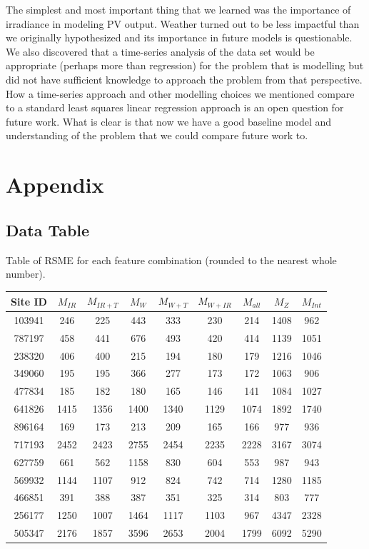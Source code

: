 \documentclass[11pt, fullpage,letterpaper]{article}
\begin{document}
The simplest and most important thing that we learned was the importance of irradiance in modeling PV output. Weather turned out to be less impactful than we originally hypothesized and its importance in future models is questionable. We also discovered that a time-series analysis of the data set would be appropriate (perhaps more than regression) for the problem that is modelling but did not have sufficient knowledge to approach the problem from that perspective. How a time-series approach and other modelling choices we mentioned compare to a standard least squares linear regression approach is an open question for future work. What is clear is that now we have a good baseline model and understanding of the problem that we could compare future work to. 


\clearpage




\section*{Appendix}

\subsection*{Data Table}
Table of RSME for each feature combination (rounded to the nearest whole number).
\begin{center}
    \begin{tabular}{|c|c|c|c|c|c|c|c|c|}
        \hline
        Site ID & $M_{IR}$ & $M_{IR + T}$ & $M_{W}$ & $M_{W + T}$ & $M_{W + IR}$ & $M_{all}$ & $M_{Z}$ & $M_{Int}$ \\
        \hline
        103941 & 246&225&443&333&230&214&1408&962 \\
        \hline
        787197&458&441&676&493&420&414&1139&1051 \\
        \hline
        238320&406&400&215&194&180&179&1216&1046 \\
        \hline
        349060&195&195&366&277&173&172&1063&906 \\
        \hline
        477834&185&182&180&165&146&141&1084&1027 \\
        \hline
        641826&1415&1356&1400&1340&1129&1074&1892&1740 \\
        \hline
        896164&169&173&213&209&165&166&977&936 \\
        \hline
        717193&2452&2423&2755&2454&2235&2228&3167&3074 \\
        \hline
        627759&661&562&1158&830&604&553&987&943\\
        \hline
        569932&1144&1107&912&824&742&714&1280&1185 \\
        \hline
        466851&391&388&387&351&325&314&803&777 \\
        \hline
        256177&1250&1007&1464&1117&1103&967&4347&2328 \\
        \hline
        505347&2176&1857&3596&2653&2004&1799&6092&5290 \\
        \hline

    \end{tabular}
\end{center}
\end{document}
